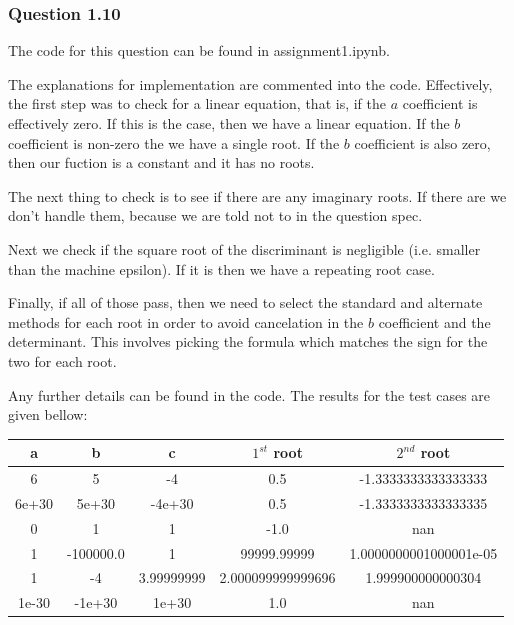 \documentclass{article}
\begin{document}
\subsubsection{Question 1.10}
The code for this question can be found in assignment1.ipynb.

The explanations for implementation are commented into the code.
Effectively, the first step was to check for a linear equation,
that is, if the $a$ coefficient is effectively zero. If this is
the case, then we have a linear equation. If the $b$ coefficient
is non-zero the we have a single root. If the $b$ coefficient is
also zero, then our fuction is a constant and it has no roots.


The next thing to check is to see if there are any imaginary roots.
If there are we don't handle them, because we are told not to in the
question spec.


Next we check if the square root of the discriminant is negligible
(i.e. smaller than the machine epsilon). If it is then we have a
repeating root case.

Finally, if all of those pass, then we need to select the standard
and alternate methods for each root in order to avoid cancelation in the
$b$ coefficient and the determinant. This involves picking the formula
which matches the sign for the two for each root.


Any further details can be found in the code. The results for the test
cases are given bellow:

\begin{center}
\begin{tabular}{| c c c || c | c|}
\hline
a & b & c & $1^{st}$ root & $2^{nd}$ root \\
\hline
6 & 5 & -4 & 0.5 & -1.3333333333333333\\
6e+30 & 5e+30 & -4e+30 & 0.5 & -1.3333333333333335\\
0 & 1 & 1 & -1.0 & nan\\
1 & -100000.0 & 1 & 99999.99999 & 1.0000000001000001e-05\\
1 & -4 & 3.99999999 & 2.000099999999696 & 1.999900000000304\\
1e-30 & -1e+30 & 1e+30 & 1.0 & nan\\
\hline
\end{tabular}
\end{center}
\end{document}

